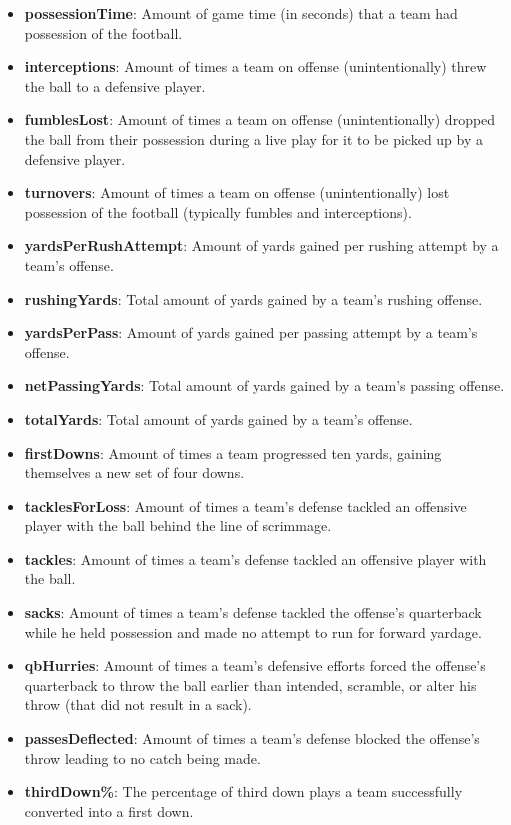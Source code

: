 \documentclass[11pt]{amsart}
\theoremstyle{definition}                  %
\theoremstyle{remark}                       %
\numberwithin{equation}{section}
\begin{document}
\begin{itemize}
    \item \textbf{possessionTime}: Amount of game time (in seconds) that a team had possession of the football.
    \item \textbf{interceptions}: Amount of times a team on offense (unintentionally) threw the ball to a defensive player.
    \item \textbf{fumblesLost}: Amount of times a team on offense (unintentionally) dropped the ball from their possession during a live play for it to be picked up by a defensive player.
    \item \textbf{turnovers}: Amount of times a team on offense (unintentionally) lost possession of the football (typically fumbles and interceptions).
    \item \textbf{yardsPerRushAttempt}: Amount of yards gained per rushing attempt by a team's offense.
    \item \textbf{rushingYards}: Total amount of yards gained by a team's rushing offense.
    \item \textbf{yardsPerPass}: Amount of yards gained per passing attempt by a team's offense.
    \item \textbf{netPassingYards}: Total amount of yards gained by a team's passing offense.
    \item \textbf{totalYards}: Total amount of yards gained by a team's offense.
    \item \textbf{firstDowns}: Amount of times a team progressed ten yards, gaining themselves a new set of four downs.
    \item \textbf{tacklesForLoss}: Amount of times a team's defense tackled an offensive player with the ball behind the line of scrimmage.
    \item \textbf{tackles}: Amount of times a team's defense tackled an offensive player with the ball.
    \item \textbf{sacks}: Amount of times a team's defense tackled the offense's quarterback while he held possession and made no attempt to run for forward yardage.
    \item \textbf{qbHurries}: Amount of times a team's defensive efforts forced the offense's quarterback to throw the ball earlier than intended, scramble, or alter his throw (that did not result in a sack).
    \item \textbf{passesDeflected}: Amount of times a team's defense blocked the offense's throw leading to no catch being made.
    \item \textbf{thirdDown\%}: The percentage of third down plays a team successfully converted into a first down.
\end{itemize}
\FloatBarrier
\end{document}
